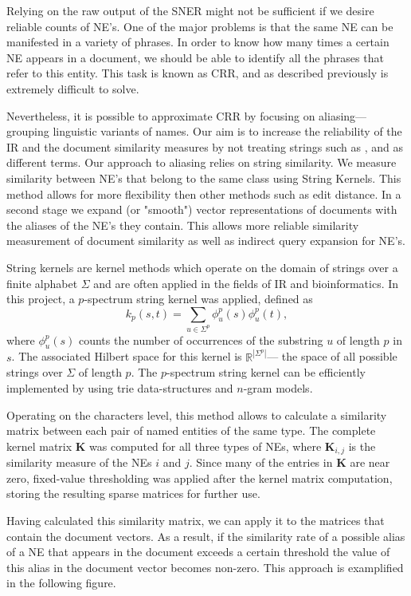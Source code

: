 Relying on the raw output of the SNER might not be sufficient if we desire reliable counts of NE's. One of the major problems is that the same
NE can be manifested in a variety of phrases. In order to know how many times a certain NE appears in a document, we should be able to identify all the phrases that refer to this entity. This task is known as CRR, and as described previously is extremely difficult to solve.

Nevertheless, it is possible to approximate CRR by focusing on aliasing--- grouping linguistic variants of names. Our aim is to increase the reliability of the IR and the document similarity measures by not treating strings such as  ,  and  as different terms. Our approach to aliasing relies on string similarity. We measure similarity between NE's that belong to the same class using String Kernels. This method allows for more flexibility then other methods such as edit distance. In a second stage we expand (or "smooth") vector representations of documents with the aliases of the NE's they contain. This allows more reliable similarity measurement of document similarity as well as indirect query expansion for NE's. 

String kernels are kernel methods which operate on the domain of strings over
a finite alphabet $\Sigma$ and are often applied in the fields of IR and bioinformatics. In this project, a
$p$-spectrum string kernel was applied, defined as
\[k_p(s,t) = \sum_{u \in \Sigma^p}{\phi_u^p(s)\phi_u^p(t)},\]
where $\phi_u^p(s)$ counts the number of occurrences of the substring $u$ of length $p$ in $s$. The
associated Hilbert space for this kernel is $\mathbb{R}^{|\Sigma^p|}$--- the space of all possible
strings over $\Sigma$ of length $p$. The $p$-spectrum string kernel can be efficiently implemented by using trie data-structures and $n$-gram models.

Operating on the characters level, this method allows to calculate a similarity matrix between each pair of named entities of the same type. 
The complete kernel matrix $\textbf{K}$ was computed for all three types of NEs, where $\textbf{K}_{i,j}$ is the similarity measure of the NEs $i$ and $j$. Since many of the entries in $\textbf{K}$ are near zero, fixed-value thresholding was applied after the kernel matrix computation, storing the resulting sparse matrices for further use.

Having calculated this similarity matrix, we can apply it to the matrices that contain the document vectors. As a result, if the similarity rate of a possible alias of a NE that appears in the document exceeds a certain threshold the value of this alias in the document vector becomes non-zero. This approach is examplified in the following figure.


